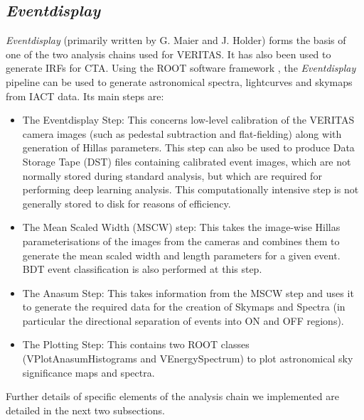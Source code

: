\subsection{\textit{Eventdisplay}}

\textit{Eventdisplay} (primarily written by G. Maier and J. Holder) \cite{evdisp} forms the basis of one of the two analysis chains used for VERITAS. It has also been used to generate IRFs for CTA. Using the ROOT software framework \cite{root}, the \textit{Eventdisplay} pipeline can be used to generate astronomical spectra, lightcurves and skymaps from IACT data. Its main steps are:

\begin{itemize}
\item The Eventdisplay Step: This concerns low-level calibration of the VERITAS camera images (such as pedestal subtraction and flat-fielding) along with generation of Hillas parameters. This step can also be used to produce Data Storage Tape (DST) files containing calibrated event images, which are not normally stored during standard analysis, but which are required for performing deep learning analysis. This computationally intensive step is not generally stored to disk for reasons of efficiency.

\item The Mean Scaled Width (MSCW) step: This takes the image-wise Hillas parameterisations of the images from the cameras and combines them to generate the mean scaled width and length parameters for a given event. BDT event classification is also performed at this step. 

\item The Anasum Step: This takes information from the MSCW step and uses it to generate the required data for the creation of Skymaps and Spectra (in particular the directional separation of events into ON and OFF regions). 

\item The Plotting Step: This contains two ROOT classes (VPlotAnasumHistograms and VEnergySpectrum) to plot astronomical sky significance maps and spectra.

\end{itemize}

Further details of specific elements of the analysis chain we implemented are detailed in the next two subsections.
